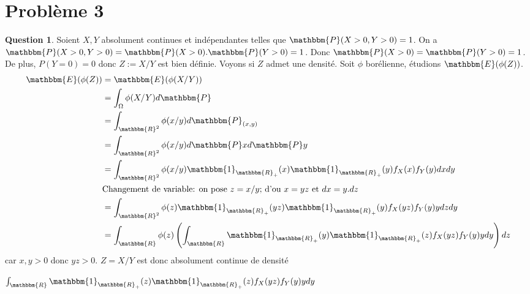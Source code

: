 \documentclass[12pt]{article}
\newcommand{\R}{\mathbbm{R}}
\newcommand{\1}{\mathbbm{1}}
\newcommand{\E}{\mathbbm{E}}
\newcommand{\Prob}{\mathbbm{P}}
\theoremstyle{definition}\newtheorem{defn}{Définition}
\theoremstyle{definition}\newtheorem{exm}{Exemple}
\theoremstyle{definition}\newtheorem{rem}{Remarque}
\theoremstyle{definition}\newtheorem{algo}{Algorithme}
\theoremstyle{remark}\newtheorem{exo}{Exercice}
\theoremstyle{remark}\newtheorem{nota}{Notation}
\theoremstyle{definition}\newtheorem{1q}{Question}
\theoremstyle{definition}\newtheorem{2q}{Question}
\theoremstyle{definition}\newtheorem{3q}{Question}
\theoremstyle{definition}\newtheorem{4q}{Question}
\theoremstyle{definition}\newtheorem{2qs1}{}
\theoremstyle{definition}\newtheorem{2qs2}{}
\theoremstyle{definition}\newtheorem{2qs3}{}
\theoremstyle{definition}\newtheorem{2qs4}{}
\theoremstyle{definition}\newtheorem{4qs2}{}
\theoremstyle{definition}\newtheorem{4qs3}{}
\begin{document}

\pagebreak

\section{Problème 3}

\begin{3q}
Soient $X,Y$ absolument continues et indépendantes telles que $\Prob(X>0,Y>0)=1$. On a $\Prob(X>0,Y>0)=\Prob(X>0).\Prob(Y>0)=1$.\newline
 Donc $\Prob(X>0)=\Prob(Y>0)=1$. De plus, $P(Y=0)=0$ donc $Z := X/Y$ est bien définie. Voyons si $Z$ admet une densité. Soit $\phi$ borélienne, étudions $\E(\phi(Z))$.
	\begin{align*}
 \E(\phi(Z)) &= \E(\phi(X/Y))\\
&=\int_{\Omega} \phi(X/Y)d\Prob\\
&= \int_{\R^2}\phi(x/y)d\Prob_{(x,y)}\\
&= \int_{\R^2}\phi(x/y)d\Prob xd\Prob y\\
&= \int_{\R^2}\phi(x/y)\1_{\R_+}(x)\1_{\R_+}(y)f_X(x)f_Y(y)dxdy\\
&\text{Changement de variable: on pose $z = x/y$; d'ou $x=yz$ et $dx=y.dz$}\\
&= \int_{\R^2}\phi(z)\1_{\R_+}(yz)\1_{\R_+}(y)f_X(yz)f_Y(y)ydzdy\\
&=\int_{\R}\phi(z)\left(\int_{\R}\1_{\R_+}(y)\1_{\R_+}(z)f_X(yz)f_Y(y)ydy\right)dz
	\end{align*}
car $x,y>0$ donc $yz>0$. \newline
$Z=X/Y$ est donc absolument continue de densité 
 \begin{center}$\int_{\R}\1_{\R_+}(z)\1_{\R_+}(z)f_X(yz)f_Y(y)ydy$ \end{center}
\end{3q}
\end{document}

